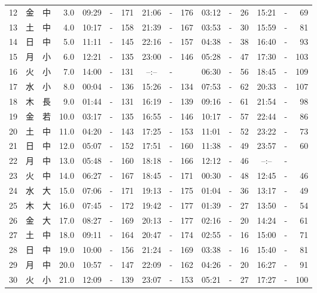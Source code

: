 \documentclass[12pt.a4j]{jsarticle}
\begin{document}
\begin{center}
\begin{table}[ht]
\begin{tabular}{|rc|cr|ccrccr|ccrccr|}
12 & 金 & 中 &  3.0 &  09:29 &-& 171  &  21:06 &-& 176  &   03:12 &-&  26  &   15:21 &-&  69  \\
13 & 土 & 中 &  4.0 &  10:17 &-& 158  &  21:39 &-& 167  &   03:53 &-&  30  &   15:59 &-&  81  \\
14 & 日 & 中 &  5.0 &  11:11 &-& 145  &  22:16 &-& 157  &   04:38 &-&  38  &   16:40 &-&  93  \\
15 & 月 & 小 &  6.0 &  12:21 &-& 135  &  23:00 &-& 146  &   05:28 &-&  47  &   17:30 &-& 103  \\
16 & 火 & 小 &  7.0 &  14:00 &-& 131  &  --:-- &-&     &   06:30 &-&  56  &   18:45 &-& 109  \\
17 & 水 & 小 &  8.0 &  00:04 &-& 136  &  15:26 &-& 134  &   07:53 &-&  62  &   20:33 &-& 107  \\
18 & 木 & 長 &  9.0 &  01:44 &-& 131  &  16:19 &-& 139  &   09:16 &-&  61  &   21:54 &-&  98  \\
19 & 金 & 若 & 10.0 &  03:17 &-& 135  &  16:55 &-& 146  &   10:17 &-&  57  &   22:44 &-&  86  \\
20 & 土 & 中 & 11.0 &  04:20 &-& 143  &  17:25 &-& 153  &   11:01 &-&  52  &   23:22 &-&  73  \\
21 & 日 & 中 & 12.0 &  05:07 &-& 152  &  17:51 &-& 160  &   11:38 &-&  49  &   23:57 &-&  60  \\
22 & 月 & 中 & 13.0 &  05:48 &-& 160  &  18:18 &-& 166  &   12:12 &-&  46  &   --:-- &-&     \\
23 & 火 & 中 & 14.0 &  06:27 &-& 167  &  18:45 &-& 171  &   00:30 &-&  48  &   12:45 &-&  46  \\
24 & 水 & 大 & 15.0 &  07:06 &-& 171  &  19:13 &-& 175  &   01:04 &-&  36  &   13:17 &-&  49  \\
25 & 木 & 大 & 16.0 &  07:45 &-& 172  &  19:42 &-& 177  &   01:39 &-&  27  &   13:50 &-&  54  \\
26 & 金 & 大 & 17.0 &  08:27 &-& 169  &  20:13 &-& 177  &   02:16 &-&  20  &   14:24 &-&  61  \\
27 & 土 & 中 & 18.0 &  09:11 &-& 164  &  20:47 &-& 174  &   02:55 &-&  16  &   15:00 &-&  71  \\
28 & 日 & 中 & 19.0 &  10:00 &-& 156  &  21:24 &-& 169  &   03:38 &-&  16  &   15:40 &-&  81  \\
29 & 月 & 中 & 20.0 &  10:57 &-& 147  &  22:09 &-& 162  &   04:26 &-&  20  &   16:27 &-&  91  \\
30 & 火 & 小 & 21.0 &  12:09 &-& 139  &  23:07 &-& 153  &   05:21 &-&  27  &   17:27 &-& 100  \\

\end{tabular}
\end{table}
\end{center}
\end{document}
